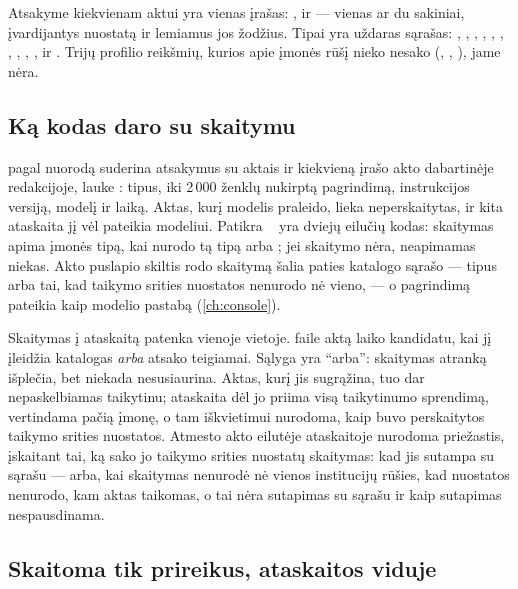 Atsakyme kiekvienam aktui yra vienas įrašas: ,  ir
 --- vienas ar du sakiniai, įvardijantys nuostatą ir lemiamus jos žodžius. Tipai
yra uždaras sąrašas: , , , ,
, , , ,
, ,  ir . Trijų profilio
reikšmių, kurios apie įmonės rūšį nieko nesako (, ,
), jame nėra.

\subsection{Ką kodas daro su skaitymu}

 pagal nuorodą suderina atsakymus su aktais ir kiekvieną įrašo akto dabartinėje
redakcijoje, lauke : tipus, iki 2\,000 ženklų nukirptą
pagrindimą, instrukcijos versiją, modelį ir laiką. Aktas, kurį modelis praleido, lieka
neperskaitytas, ir kita ataskaita jį vėl pateikia modeliui. Patikra
~ yra dviejų eilučių kodas: skaitymas apima įmonės tipą, kai nurodo tą
tipą arba ; jei skaitymo nėra, neapimamas niekas. Akto puslapio skiltis
 rodo skaitymą šalia paties katalogo sąrašo --- tipus arba tai, kad taikymo
srities nuostatos nenurodo nė vieno, --- o pagrindimą pateikia kaip modelio pastabą
(\cref{ch:console}).

Skaitymas į ataskaitą patenka vienoje vietoje.  faile
 aktą laiko kandidatu, kai jį įleidžia katalogas \emph{arba}
 atsako teigiamai. Sąlyga yra \enquote{arba}: skaitymas atranką išplečia, bet
niekada nesusiaurina. Aktas, kurį jis sugrąžina, tuo dar nepaskelbiamas taikytinu; ataskaita
dėl jo priima visą taikytinumo sprendimą, vertindama pačią įmonę, o tam iškvietimui nurodoma,
kaip buvo perskaitytos taikymo srities nuostatos. Atmesto akto eilutėje ataskaitoje nurodoma
priežastis, įskaitant tai, ką sako jo taikymo srities nuostatų skaitymas: kad jis sutampa su
sąrašu --- arba, kai skaitymas nenurodė nė vienos institucijų rūšies, kad nuostatos nenurodo,
kam aktas taikomas, o tai nėra sutapimas su sąrašu ir kaip sutapimas nespausdinama.

\subsection{Skaitoma tik prireikus, ataskaitos viduje}

